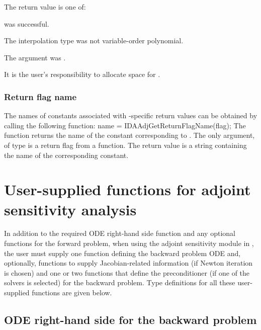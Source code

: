 {
  The return value  is one of:
  \begin{args}
  \item[\Id{IDA\_SUCCESS}] 
     was successful.
  \item[\Id{IDA\_ILL\_INPUT}]
    The interpolation type was not variable-order polynomial.
  \item[\Id{IDA\_ADJMEM\_NULL}]
    The  argument was .
  \end{args}
}
{
  It is the user's responsibility to allocate space for .
}
\subsubsection{Return flag name}
The names of constants associated with {\idaa}-specific return values can
be obtained by calling the following function:
{
  name = IDAAdjGetReturnFlagName(flag);
}
{
  The function  returns the
  name of the {\idaa} constant corresponding to .
}
{
  The only argument, of type  is a return flag from a {\idaa} function.
}
{
  The return value is a string containing the name of the corresponding constant.
}
{}
\section{User-supplied functions for adjoint sensitivity analysis}
\label{ss:user_fct_adj}

In addition to the required ODE right-hand side function and any optional functions
for the forward problem, when using the adjoint sensitivity module in {\idas},
the user must supply one function defining the backward problem ODE and, optionally,
functions to supply Jacobian-related information (if Newton iteration is chosen) and
one or two functions that define the preconditioner (if one of the {\idaspils} solvers is
selected) for the backward problem.
Type definitions for all these user-supplied functions are given below.

\subsection{ODE right-hand side for the backward problem}

